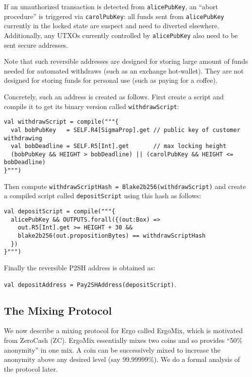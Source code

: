 \documentclass[11pt]{article}
\newcommand{\mixname}{ErgoMix\xspace}
\begin{document}
If an unauthorized transaction is detected from \texttt{alicePubKey}, an ``abort procedure'' is triggered via \texttt{carolPubKey}: all funds sent from \texttt{alicePubKey} currently in the locked state are suspect and need to diverted elsewhere. Additionally, any UTXOs currently controlled by \texttt{alicePubKey} also need to be sent secure addresses. 

Note that such reversible addresses are designed for storing large amount of funds needed for automated withdraws (such as an exchange hot-wallet). They are not designed for storing funds for personal use (such as paying for a coffee).

Concretely, such an address is created as follows. First create a script and compile it to get its binary version called \texttt{withdrawScript}:
\begin{verbatim}
val withdrawScript = compile("""{
  val bobPubKey   = SELF.R4[SigmaProp].get // public key of customer withdrawing
  val bobDeadline = SELF.R5[Int].get       // max locking height
  (bobPubKey && HEIGHT > bobDeadline) || (carolPubKey && HEIGHT <= bobDeadline)
}""")
\end{verbatim}

Then compute \texttt{withdrawScriptHash = Blake2b256(withdrawScript)} and create a compiled script called \texttt{depositScript} using this hash as follows:

\begin{verbatim}
val depositScript = compile("""{ 
  alicePubKey && OUTPUTS.forall({(out:Box) =>
    out.R5[Int].get >= HEIGHT + 30 &&
    blake2b256(out.propositionBytes) == withdrawScriptHash
  })
}""")
\end{verbatim}

Finally the reversible P2SH address is obtained as:

 \texttt{val depositAddress = Pay2SHAddress(depositScript)}.

\subsection{The Mixing Protocol}

We now describe a mixing protocol for Ergo called \mixname, which is motivated from ZeroCash (ZC). 
\mixname essentially mixes two coins and so provides ``50\% anonymity'' in one mix. A coin can be successively mixed to increase the anonymity above any desired level (say 99.99999\%). We do a formal analysis of the protocol later. 
\end{document}
